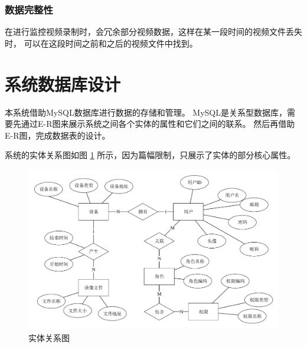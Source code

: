 \subsubsection{数据完整性}
在进行监控视频录制时，会冗余部分视频数据，这样在某一段时间的视频文件丢失时，
可以在这段时间之前和之后的视频文件中找到。

\section{系统数据库设计}
本系统借助MySQL数据库进行数据的存储和管理。
MySQL是关系型数据库，需要先通过E-R图来展示系统之间各个实体的属性和它们之间的联系\cite{李济同0}。
然后再借助 E-R图，完成数据表的设计。

系统的实体关系图如图 \ref{Fig:erd} 所示，因为篇幅限制，只展示了实体的部分核心属性。

\begin{figure}[ht]
    \centering
    \includegraphics[width=1\linewidth]{./Figure/IMG_er.pdf}
    \caption{实体关系图}\label{Fig:erd}
\end{figure}






